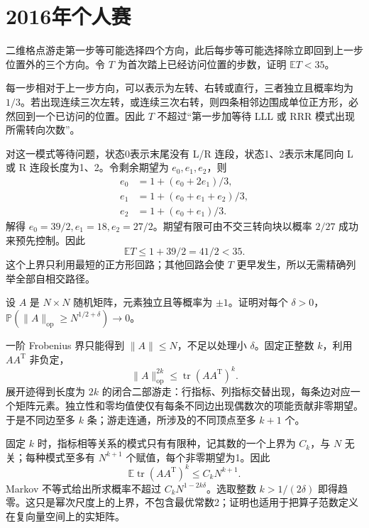 \documentclass[UTF8,12pt,a4paper,fontset=fandol]{ctexbook}
\newcommand{\E}{\mathbb E}
\newcommand{\PP}{\mathbb P}
\begin{document}
\section{2016年个人赛}
\begin{example}[原题1：不立即回头的格点游走]\label{yau:2016-1}
二维格点游走第一步等可能选择四个方向，此后每步等可能选择除立即回到上一步位置外的三个方向。令 $T$ 为首次踏上已经访问位置的步数，证明 $\E T<35$。
\end{example}
\begin{solve}
每一步相对于上一步方向，可以表示为左转、右转或直行，三者独立且概率均为 $1/3$。若出现连续三次左转，或连续三次右转，则四条相邻边围成单位正方形，必然回到一个已访问的位置。因此 $T$ 不超过“第一步加等待 LLL 或 RRR 模式出现所需转向次数”。

对这一模式等待问题，状态0表示末尾没有 L/R 连段，状态1、2表示末尾同向 L 或 R 连段长度为1、2。令剩余期望为 $e_0,e_1,e_2$，则
\[
\begin{aligned}
e_0&=1+(e_0+2e_1)/3,\\
e_1&=1+(e_0+e_1+e_2)/3,\\
e_2&=1+(e_0+e_1)/3.
\end{aligned}
\]
解得 $e_0=39/2,e_1=18,e_2=27/2$。期望有限可由不交三转向块以概率 $2/27$ 成功来预先控制。因此
\[
\E T\le1+39/2=41/2<35.
\]
这个上界只利用最短的正方形回路；其他回路会使 $T$ 更早发生，所以无需精确列举全部自相交路径。
\end{solve}

\begin{example}[原题2：随机符号矩阵的算子范数]\label{yau:2016-2}
设 $A$ 是 $N\times N$ 随机矩阵，元素独立且等概率为 $\pm1$。证明对每个 $\delta>0$，$\PP(\|A\|_{\mathrm{op}}\ge N^{1/2+\delta})\to0$。
\end{example}
\begin{solve}
一阶 Frobenius 界只能得到 $\|A\|\le N$，不足以处理小 $\delta$。固定正整数 $k$，利用 $AA^{\mathrm T}$ 非负定，
\[
\|A\|_{\mathrm{op}}^{2k}\le\operatorname{tr}(AA^{\mathrm T})^k.
\]
展开迹得到长度为 $2k$ 的闭合二部游走：行指标、列指标交替出现，每条边对应一个矩阵元素。独立性和零均值使仅有每条不同边出现偶数次的项能贡献非零期望。于是不同边至多 $k$ 条；游走连通，所涉及的不同顶点至多 $k+1$ 个。

固定 $k$ 时，指标相等关系的模式只有有限种，记其数的一个上界为 $C_k$，与 $N$ 无关；每种模式至多有 $N^{k+1}$ 个赋值，每个非零期望为1。因此
\[
\E\operatorname{tr}(AA^{\mathrm T})^k\le C_kN^{k+1}.
\]
Markov 不等式给出所求概率不超过 $C_kN^{1-2k\delta}$。选取整数 $k>1/(2\delta)$ 即得趋零。这只是幂次尺度上的上界，不包含最优常数2；证明也适用于把算子范数定义在复向量空间上的实矩阵。
\end{solve}
\end{document}
